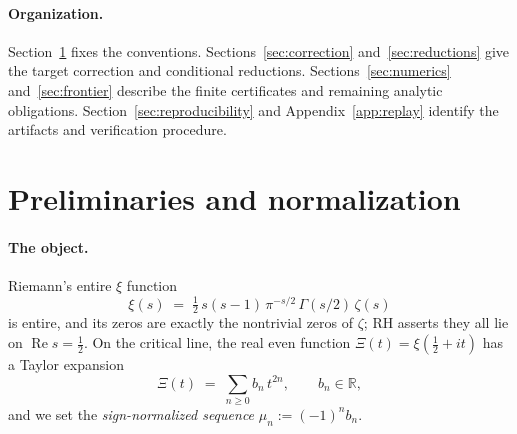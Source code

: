 \documentclass[11pt]{article}
\theoremstyle{plain}
\theoremstyle{definition}
\theoremstyle{remark}
\newcommand{\R}{\mathbb{R}}
\newcommand{\Xib}{\Xi}
\DeclareMathOperator{\re}{Re}
\begin{document}
\paragraph{Organization.} Section~\ref{sec:notation} fixes the conventions.
Sections~\ref{sec:correction} and~\ref{sec:reductions} give the target correction
and conditional reductions. Sections~\ref{sec:numerics} and~\ref{sec:frontier}
describe the finite certificates and remaining analytic obligations.
Section~\ref{sec:reproducibility} and Appendix~\ref{app:replay} identify the
artifacts and verification procedure.

\section{Preliminaries and normalization}\label{sec:notation}

\paragraph{The object.} Riemann's entire $\xi$ function
\begin{equation}\label{eq:xi}
  \xi(s) \;=\; \tfrac{1}{2}\,s(s-1)\,\pi^{-s/2}\,\Gamma(s/2)\,\zeta(s)
\end{equation}
is entire, and its zeros are exactly the nontrivial zeros of $\zeta$; RH asserts
they all lie on $\re s = \tfrac12$. On the critical line, the real even function
$\Xib(t) = \xi(\tfrac12 + it)$ has a Taylor expansion
\begin{equation}\label{eq:taylor}
  \Xib(t) \;=\; \sum_{n\ge 0} b_n\, t^{2n},\qquad b_n\in\R,
\end{equation}
and we set the \emph{sign-normalized sequence} $\mu_n := (-1)^n b_n$.
\end{document}
